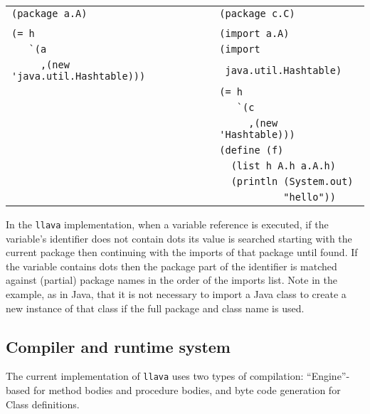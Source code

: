 \documentclass{acm_proc_article-sp}
\begin{document}
\scriptsize
\begin{tabular}{l|l}
\verb+(package a.A)+                                   & \verb+(package c.C)+ \\
                                                       &                     \\
\verb+(= h+                                            & \verb+(import a.A)+ \\
\verb+   `(a+                                          & \verb+(import+ \\
\verb+     ,(new 'java.util.Hashtable)))+              & \verb+ java.util.Hashtable)+ \\
                                                       & \verb+(= h+ \\
                                                       & \verb+   `(c+ \\
                                                       & \verb+     ,(new 'Hashtable)))+ \\
                                                       & \verb+(define (f)+ \\
                                                       & \verb+  (list h A.h a.A.h)+ \\
                                                       & \verb+  (println (System.out)+ \\
                                                       & \verb+           "hello"))+ \\
\end{tabular}
\normalsize

In the {\tt llava} implementation, when a variable reference is
executed, if the variable's identifier does not contain dots its value
is searched starting with the current package then continuing with the
imports of that package until found.  If the variable contains dots
then the package part of the identifier is matched against (partial)
package names in the order of the imports list.  Note in the example,
as in Java, that it is not necessary to import a Java class to create
a new instance of that class if the full package and class name is
used.


\subsection{Compiler and runtime system}

The current implementation of {\tt llava} uses two types of
compilation: ``Engine''-based for method bodies and procedure bodies,
and byte code generation for Class definitions.
\end{document}
